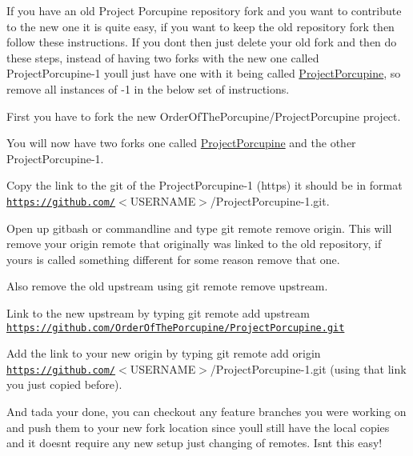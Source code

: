 If you have an old Project Porcupine repository fork and you want to contribute to the new one it is quite easy, if you want to keep the old repository fork then follow these instructions. If you don\textquotesingle{}t then just delete your old fork and then do these steps, instead of having two forks with the new one called {\ttfamily Project\+Porcupine-\/1} you\textquotesingle{}ll just have one with it being called {\ttfamily \hyperlink{namespace_project_porcupine}{Project\+Porcupine}}, so remove all instances of {\ttfamily -\/1} in the below set of instructions.
\begin{DoxyEnumerate}
\item First you have to fork the new {\ttfamily Order\+Of\+The\+Porcupine/\+Project\+Porcupine} project.
\item You will now have two forks one called {\ttfamily \hyperlink{namespace_project_porcupine}{Project\+Porcupine}} and the other {\ttfamily Project\+Porcupine-\/1}.
\item Copy the link to the git of the {\ttfamily Project\+Porcupine-\/1} (https) it should be in format {\ttfamily \href{https://github.com/}{\tt https\+://github.\+com/}$<$U\+S\+E\+R\+N\+A\+ME$>$/\+Project\+Porcupine-\/1.git}.
\item Open up gitbash or commandline and type {\ttfamily git remote remove origin}. This will remove your origin remote that originally was linked to the old repository, if your\textquotesingle{}s is called something different for some reason remove that one.
\item Also remove the old upstream using {\ttfamily git remote remove upstream}.
\item Link to the new upstream by typing {\ttfamily git remote add upstream \href{https://github.com/OrderOfThePorcupine/ProjectPorcupine.git}{\tt https\+://github.\+com/\+Order\+Of\+The\+Porcupine/\+Project\+Porcupine.\+git}}
\item Add the link to your new origin by typing {\ttfamily git remote add origin \href{https://github.com/}{\tt https\+://github.\+com/}$<$U\+S\+E\+R\+N\+A\+ME$>$/\+Project\+Porcupine-\/1.git} (using that link you just copied before).
\item And tada your done, you can checkout any feature branches you were working on and push them to your new fork location since you\textquotesingle{}ll still have the local copies and it doesn\textquotesingle{}t require any new setup just changing of remotes. Isn\textquotesingle{}t this easy!
\end{DoxyEnumerate}


